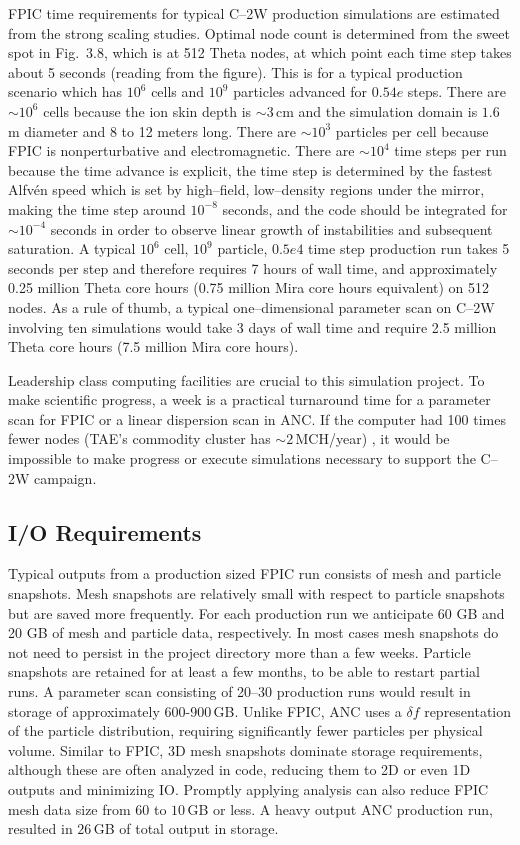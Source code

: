 \documentclass[a4paper,openany,12pt]{book}
\begin{document}
FPIC time requirements for typical C--2W production simulations are estimated from the strong scaling studies. Optimal node count is determined from the sweet spot in Fig.~3.8, which is at 512 Theta nodes, at which point each time step takes about 5 seconds (reading from the figure). This is for a typical production scenario which has $10^6$ cells and $10^9$ particles advanced for $0.54e$ steps. There are $\sim 10^6$ cells because the ion skin depth is $\sim 3\,$cm and the simulation domain is $1.6\,$m diameter and 8 to 12 meters long. There are $\sim 10^3$ particles per cell because FPIC is nonperturbative and electromagnetic. There are $\sim 10^4$ time steps per run because the time advance is explicit, the time step is determined by the fastest Alfv\'en speed which is set by high--field, low--density regions under the mirror, making the time step around $10^{-8}$ seconds, and the code should be integrated for $\sim 10^{-4}$ seconds in order to observe linear growth of instabilities and subsequent saturation. A typical $10^6$ cell, $10^9$ particle, $0.5e4$ time step production run takes 5 seconds per step and therefore requires 7 hours of wall time, and approximately 0.25 million Theta core hours (0.75 million Mira core hours equivalent) on 512 nodes. As a rule of thumb, a typical one--dimensional parameter scan on C--2W involving ten simulations would take 3 days of wall time and require 2.5 million Theta core hours (7.5 million Mira core hours).

Leadership class computing facilities are crucial to this simulation project. To make scientific progress, a week is a practical turnaround time for a parameter scan for FPIC or a linear dispersion scan in ANC. If the computer had 100 times fewer nodes (TAE's commodity cluster has $\sim 2\,$MCH/year) , it would be impossible to make progress or execute simulations necessary to support the C--2W campaign.

\subsection*{I/O Requirements}

Typical outputs from a production sized FPIC run consists of mesh and particle snapshots. Mesh snapshots are relatively small with respect to particle snapshots but are saved more frequently. For each production run we anticipate 60 GB and 20 GB of mesh and particle data, respectively. In most cases mesh snapshots do not need to persist in the project directory more than a few weeks. Particle snapshots are retained for at least a few months, to be able to restart partial runs. A parameter scan consisting of 20--30 production runs would result in storage of approximately 600-900$\,$GB. Unlike FPIC, ANC uses a $\delta f$ representation of the particle distribution, requiring significantly fewer particles per physical volume. Similar to FPIC, 3D mesh snapshots dominate storage requirements, although these are often analyzed in code, reducing them to 2D or even 1D outputs and minimizing IO. Promptly applying analysis can also reduce FPIC mesh data size from 60 to $10\,$GB or less. A heavy output ANC production run, resulted in $26\,$GB of total output in storage.
\end{document}
